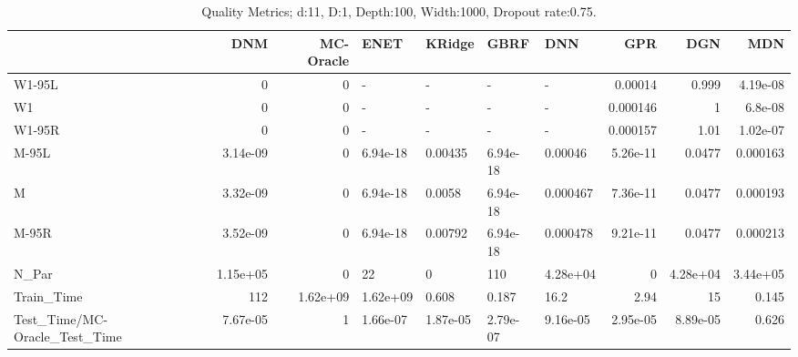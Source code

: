 \begin{table}
\centering
\caption{Quality Metrics; d:11, D:1, Depth:100, Width:1000, Dropout rate:0.75.}
\begin{tabular}{lrrllllrrr}
\toprule
{} &      DNM &  MC-Oracle &     ENET &   KRidge &     GBRF &      DNN &      GPR &      DGN &      MDN \\
\midrule
W1-95L                        &        0 &          0 &        - &        - &        - &        - &  0.00014 &    0.999 & 4.19e-08 \\
W1                            &        0 &          0 &        - &        - &        - &        - & 0.000146 &        1 &  6.8e-08 \\
W1-95R                        &        0 &          0 &        - &        - &        - &        - & 0.000157 &     1.01 & 1.02e-07 \\
M-95L                         & 3.14e-09 &          0 & 6.94e-18 &  0.00435 & 6.94e-18 &  0.00046 & 5.26e-11 &   0.0477 & 0.000163 \\
M                             & 3.32e-09 &          0 & 6.94e-18 &   0.0058 & 6.94e-18 & 0.000467 & 7.36e-11 &   0.0477 & 0.000193 \\
M-95R                         & 3.52e-09 &          0 & 6.94e-18 &  0.00792 & 6.94e-18 & 0.000478 & 9.21e-11 &   0.0477 & 0.000213 \\
N\_Par                         & 1.15e+05 &          0 &       22 &        0 &      110 & 4.28e+04 &        0 & 4.28e+04 & 3.44e+05 \\
Train\_Time                    &      112 &   1.62e+09 & 1.62e+09 &    0.608 &    0.187 &     16.2 &     2.94 &       15 &    0.145 \\
Test\_Time/MC-Oracle\_Test\_Time & 7.67e-05 &          1 & 1.66e-07 & 1.87e-05 & 2.79e-07 & 9.16e-05 & 2.95e-05 & 8.89e-05 &    0.626 \\
\bottomrule
\end{tabular}
\end{table}
